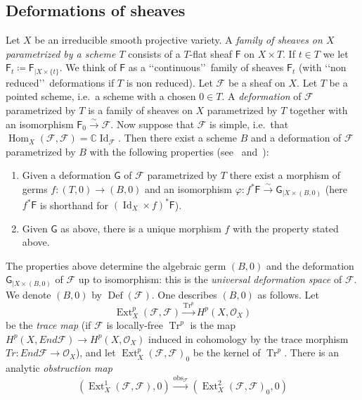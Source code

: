 \documentclass[11pt]{amsart}
\newcommand{\CC}{{\mathbb C}}
\let\mathcal\mathscr
\def\cF{\mathcal{F}}
\def\cO{\mathcal{O}}
\def\sF{{\mathsf F}}
\def\sG{{\mathsf G}}
\def\phi{{\varphi}}
\DeclareMathOperator{\Def}{Def}
\DeclareMathOperator{\Ext}{Ext}
\DeclareMathOperator{\Hom}{Hom}
\DeclareMathOperator{\Id}{Id}
\DeclareMathOperator{\obs}{obs}
\DeclareMathOperator{\Tr}{Tr}
\theoremstyle{definition}
\theoremstyle{remark}
\begin{document}
\subsection{Deformations of sheaves}\label{subsec:deformofasci}
%
%
\setcounter{equation}{0}
%
Let $X$ be an irreducible smooth projective variety. A \emph{family of  sheaves on $X$  parametrized by a scheme $T$}
consists of a $T$-flat sheaf   $\sF$ on $X\times T$. If $t\in T$ we let  $\sF_t\coloneqq\sF_{|X\times\{t\}}$. We think of $\sF$ as a \lq\lq continuous\rq\rq\ family of sheaves $\sF_t$ (with \lq\lq non reduced\rq\rq\ deformations if $T$ is non reduced).
Let $\cF$ be a  sheaf on $X$. Let $T$ be a pointed scheme, i.e.~a scheme with a  chosen  $0\in T$. A \emph{deformation} of 
$\cF$ parametrized by $T$ is a family of  sheaves on $X$  parametrized by $T$ together with an isomorphism 
$\sF_0\xrightarrow{\sim}\cF$. 
Now suppose that $\cF$ is simple, i.e.~that $\Hom_X(\cF,\cF)=\CC\Id_{\cF}$. Then there exist a scheme $B$ and a deformation of $\cF$  parametrized by $B$   with the following properties (see~\cite{artamkin:defdifasci,mukai:lisciosimpl} and~\cite[2.A.5]{huy-lehn:librofasci}):
%
\begin{enumerate}
%
\item
%
Given   a deformation  $\sG$ of $\cF$ parametrized by $T$
there exist a morphism of germs 
$f\colon (T,0)\to (B,0)$  and  an isomorphism 
$\phi\colon f^{*}\sF\xrightarrow{\sim}\sG_{|X\times (B,0)}$ (here $ f^{*}\sF$ is shorthand for $(\Id_X\times f)^{*}\sF$).
%
\item
%
Given $\sG$ as above, there is a unique morphism $f$ with the  property stated above. 
%
\end{enumerate}
%
The properties above determine 
the algebraic germ  
$(B,0)$ and the deformation $\sG_{|X\times (B,0)}$ of $\cF$ up to isomorphism: this is the \emph{universal deformation space} of $\cF$. We denote 
$(B,0)$ by $\Def(\cF)$.
One 
describes  
$(B,0)$ as follows. Let
%
\begin{equation}
%
\Ext^p_X(\cF,\cF) \xrightarrow{\Tr^p}H^p(X,\cO_X)
%
\end{equation}
%
be the \emph{trace map} (if $\cF$ is locally-free $\Tr^p$ is the map $H^p(X,End\cF) \to H^p(X,\cO_X)$ induced in cohomology by the trace morphism 
$Tr\colon End\cF\to\cO_X$), and let $\Ext^p_X(\cF,\cF)_0$ be the kernel of $\Tr^p$. There is an analytic \emph{obstruction map}
%
\begin{equation}\label{mappaostr}
%
(\Ext^1_X(\cF,\cF),0) \xrightarrow{\obs_{\cF}} (\Ext^2_X(\cF,\cF)_0,0)
%
\end{equation}
\end{document}
